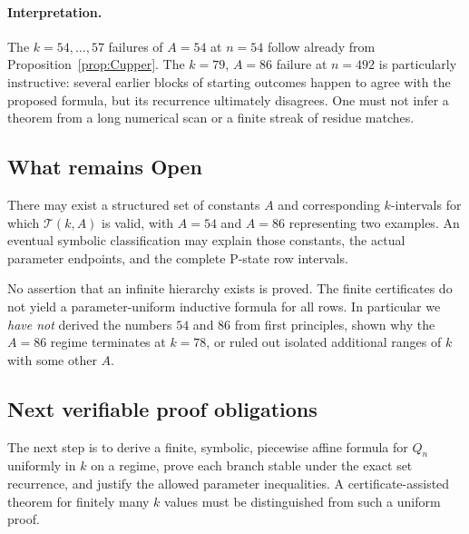 \paragraph{Interpretation.} The $k=54,\ldots,57$ failures of $A=54$ at $n=54$ follow already from Proposition~\ref{prop:Cupper}. The $k=79$, $A=86$ failure at $n=492$ is particularly instructive: several earlier blocks of starting outcomes happen to agree with the proposed formula, but its recurrence ultimately disagrees. One must not infer a theorem from a long numerical scan or a finite streak of residue matches.

\subsection{What remains Open}
\begin{conjecture}\label{conj:Chierarchy}
There may exist a structured set of constants $A$ and corresponding $k$-intervals for which $\mathcal{T}(k,A)$ is valid, with $A=54$ and $A=86$ representing two examples. An eventual symbolic classification may explain those constants, the actual parameter endpoints, and the complete P-state row intervals.
\end{conjecture}
\statusopen\quad No assertion that an infinite hierarchy exists is proved. The finite certificates do not yield a parameter-uniform inductive formula for all rows. In particular we \emph{have not} derived the numbers $54$ and $86$ from first principles, shown why the $A=86$ regime terminates at $k=78$, or ruled out isolated additional ranges of $k$ with some other $A$.

\subsection{Next verifiable proof obligations}
The next step is to derive a finite, symbolic, piecewise affine formula for $Q_n$ uniformly in $k$ on a regime, prove each branch stable under the exact set recurrence, and justify the allowed parameter inequalities. A certificate-assisted theorem for finitely many $k$ values must be distinguished from such a uniform proof.\par
